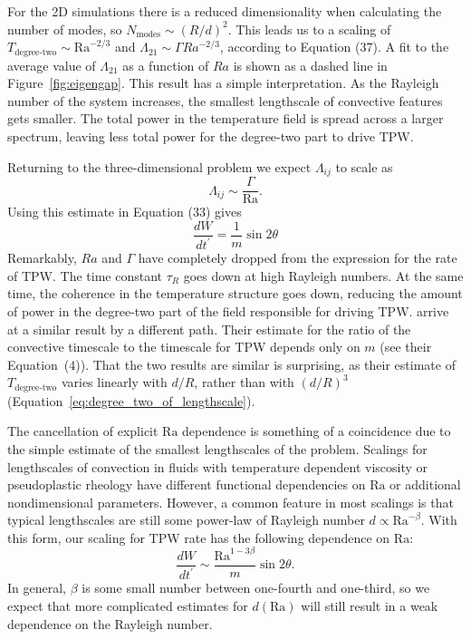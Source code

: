 \documentclass[preprint,12pt,authoryear]{elsarticle}
\begin{document}
For the 2D simulations there is a reduced dimensionality when calculating the number of modes,
so $N_\text{modes} \sim \left(R/d \right)^2$.  This leads us to a scaling of $T_{\text{degree-two}} \sim \mathrm{Ra}^{-2/3}$ and $\Lambda_{21} \sim \Gamma Ra^{-2/3}$, according to Equation (37).  A fit to the average value of $\Lambda_{21}$ as a function of $Ra$ is shown as a dashed line in Figure~\ref{fig:eigengap}.
This result has a simple interpretation.
As the Rayleigh number of the system increases, the smallest lengthscale of convective features gets smaller.
The total power in the temperature field is spread across a larger spectrum, leaving less total power for the degree-two part to drive TPW.


Returning to the three-dimensional problem we expect $\Lambda_{ij}$ to scale as
\begin{equation}
\Lambda_{ij} \sim \frac{\Gamma}{\mathrm{Ra} }.
\label{eq:lambda_estimate}
\end{equation}
Using this estimate in Equation (33) gives
\begin{equation}
\frac{d W}{dt^\prime} = \frac{1}{m} \sin 2 \theta
\end{equation}
Remarkably, $Ra$ and $\Gamma$ have completely dropped from the expression for the rate of TPW.  The time constant $\tau_R$ goes down at high Rayleigh numbers. At the same time, the  coherence in the temperature structure goes down, reducing the amount of power in the degree-two part of the field responsible for driving TPW.
\citet{tsai2007theoretical} arrive at a similar result by a different path.
Their estimate for the ratio of the convective timescale to the timescale for TPW depends only on $m$ (see their Equation~(4)).
That the two results are similar is surprising, as their estimate of $T_\text{degree-two}$ varies linearly with $d/R$,
rather than with $(d/R)^3$ (Equation~\eqref{eq:degree_two_of_lengthscale}).

The cancellation of explicit $\mathrm{Ra}$ dependence is something of a coincidence due to the simple estimate of the smallest lengthscales of the problem.
Scalings for lengthscales of convection in fluids with temperature dependent viscosity \citep[e.g.][]{solomatov1995scaling} or pseudoplastic rheology \citep[e.g.][]{korenaga2010scaling} have different functional dependencies on $\mathrm{Ra}$ or additional nondimensional parameters.
However, a common feature in most scalings is that typical lengthscales are still some power-law of Rayleigh number $d \propto \mathrm{Ra}^{-\beta}$.
With this form, our scaling for TPW rate has the following dependence on $\mathrm{Ra}$:
\begin{equation}
\frac{d W}{dt^\prime} \sim \frac{\mathrm{Ra}^{1-3\beta}}{m} \sin{2 \theta}.
\label{eq:simplest_milankovitch_defer_scaling}
\end{equation}
In general, $\beta$ is some small number between one-fourth and one-third, so we expect that more complicated estimates for 
$d(\mathrm{Ra})$ will still result in a weak dependence 
on the Rayleigh number.
\end{document}
